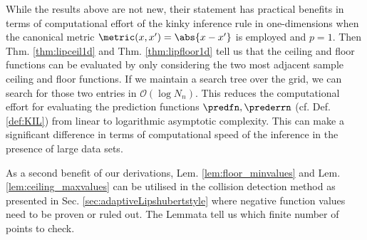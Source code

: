 \begin{rem} \label{rem:lipencl1d4KI}
While the results above are not new, their statement has practical benefits in terms of computational effort of the kinky inference rule in one-dimensions when the canonical metric $\metric(x,x') = \abs{x-x'}$ is employed and $p=1$. Then Thm. \ref{thm:lipceil1d} and Thm. \ref{thm:lipfloor1d} tell us that the ceiling and floor functions can be evaluated by only considering the two most adjacent sample ceiling and floor functions. If we maintain a search tree over the grid, we can search for those two entries in $\mathcal O(\log N_n)$. This reduces the computational effort for evaluating the prediction functions $\predfn,\prederrn$ (cf. Def. \ref{def:KIL}) from linear to logarithmic asymptotic complexity. This can make a significant difference in terms of computational speed of the inference in the presence of large data sets.

As a second benefit of our derivations, Lem. \ref{lem:floor_minvalues} and Lem. \ref{lem:ceiling_maxvalues} can be utilised in the collision detection method as presented in Sec. \ref{sec:adaptiveLipshubertstyle} where negative function values need to be proven or ruled out. The Lemmata tell us which finite number of points to check.
\end{rem}